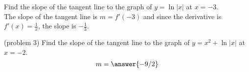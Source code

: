 \documentclass{ximera}
\begin{document}
\begin{example}[example 3]
Find the slope of the tangent line to the graph of $y = \ln|x|$ at $x = -3$.\\
The slope of the tangent line is $m = f'(-3)$ and since the derivative is $f'(x) = \frac{1}{x}$,
the slope is $-\frac13$.
\end{example}
 
\begin{problem}(problem 3)
Find the slope of the tangent line to the graph of $y= x^2 + \ln|x|$ at $x = -2$.
\[
m = \answer{-9/2}
\]
\end{problem}
 
  
\begin{foldable}
\end{foldable}
\end{document}
